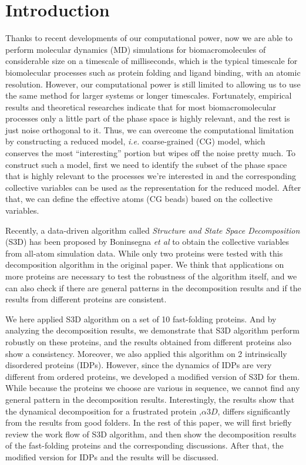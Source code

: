 \documentclass[12pt]{article}
\begin{document}
\section*{Introduction}

Thanks to recent developments of our computational power, now we are able to perform molecular dynamics (MD) simulations for biomacromolecules of considerable size on a timescale of milliseconds, which is the typical timescale for biomolecular processes such as protein folding and ligand binding, with an atomic resolution\cite{DE_Shaw_fast-folding}. However, our computational power is still limited to allowing us to use the same method for larger systems or longer timescales. Fortunately, empirical results and theoretical researches indicate that for most biomacromolecular processes only a little part of the phase space is highly relevant, and the rest is just noise orthogonal to it. Thus, we can overcome the computational limitation by constructing a reduced model, {\it i.e.} coarse-grained (CG) model, which conserves the most ``interesting'' portion but wipes off the noise pretty much. To construct such a model, first we need to identify the subset of the phase space that is highly relevant to the processes we're interested in and the corresponding collective variables can be used as the representation for the reduced model. After that, we can define the effective atoms (CG beads) based on the collective variables.

Recently, a data-driven algorithm called {\it Structure and State Space Decomposition} (S3D) has been proposed by Boninsegna {\it et al} to obtain the collective variables from all-atom simulation data\cite{Lrenzo_S3D}. While only two proteins were tested with this decomposition algorithm in the original paper. We think that applications on more proteins are necessary to test the robustness of the algorithm itself, and we can also check if there are general patterns in the decomposition results and if the results from different proteins are consistent.

We here applied S3D algorithm on a set of 10 fast-folding proteins\cite{DE_Shaw_fast-folding}. And by analyzing the decomposition results, we demonstrate that S3D algorithm perform robustly on these proteins, and the results obtained from different proteins also show a consistency. Moreover, we also applied this algorithm on 2 intrinsically disordered proteins (IDPs)\cite{ACTR}. However, since the dynamics of IDPs are very different from ordered proteins, we developed a modified version of S3D for them. While because the proteins we choose are various in sequence, we cannot find any general pattern in the decomposition results. Interestingly, the results show that the dynamical decomposition for a frustrated protein ,$\alpha 3D$, differs significantly from the results from good folders. In the rest of this paper, we will first briefly review the work flow of S3D algorithm, and then show the decomposition results of the fast-folding proteins and the corresponding discussions. After that, the modified version for IDPs and the results will be discussed. 
\end{document}
